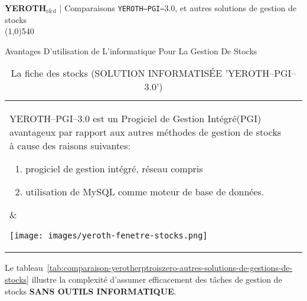 \documentclass[12pt, a4paper]{article}
\newcommand{\logicielpgi}{Progiciel de Gestion Intégré\xspace}
\newcommand{\yerothrd}{\textcolor{yerothColorGreen}
			{\textsc{\textcolor{yerothColorRed}{YEROTH}}$_{\text{r\&d}}$\xspace}}
\newcommand{\yerothpgiblack}{\texttt{YEROTH--PGI--$3.0$}\xspace}
\newcommand{\yerothpgi}{\textcolor{yerothColorBlue}{\sc YEROTH--PGI--$3.0$}\xspace}
\newcommand{\mysql}{MySQL\xspace}
\begin{document}
{\bf \Large \yerothrd} {| \sc \scriptsize Comparaisons \yerothpgiblack, et autres solutions de gestion de stocks}			
\\ \line(1,0){540}

\vspace{1.15em}


\parbox{27em}{\Large Avantages D'utilisation de L'informatique Pour
					La Gestion De Stocks}

\vspace{3.3em}

\begin{table}[!htbp]
\begin{tabular}{ll}
\parbox{27em}{
\yerothpgi est un \logicielpgi (PGI) avantageux par rapport
aux autres méthodes de gestion de stocks à cause des raisons suivantes:

\begin{enumerate}[1.]
	\itemsep -0.1em
	\item progiciel de gestion intégré, réseau compris
	\item utilisation de \mysql comme moteur de base de données. \\
\end{enumerate}
}

&

\parbox{15em}{
\begin{center}
\texttt{[image: images/yeroth-fenetre-stocks.png]}
\caption*{La fiche des stocks (SOLUTION INFORMATISÉE 'YEROTH--PGI--3.0')}
\end{center}
}
\end{tabular}
\end{table}

\vspace{0cm}

Le tableau~\ref{tab:comparaison-yerotherptroiszero-autres-solutions-de-gestions-de-stocks}
illustre la complexité d'assumer efficacement des tâches
de gestion de stocks \textbf{SANS OUTILS INFORMATIQUE}.\\

\vspace{-1em}
\end{document}
